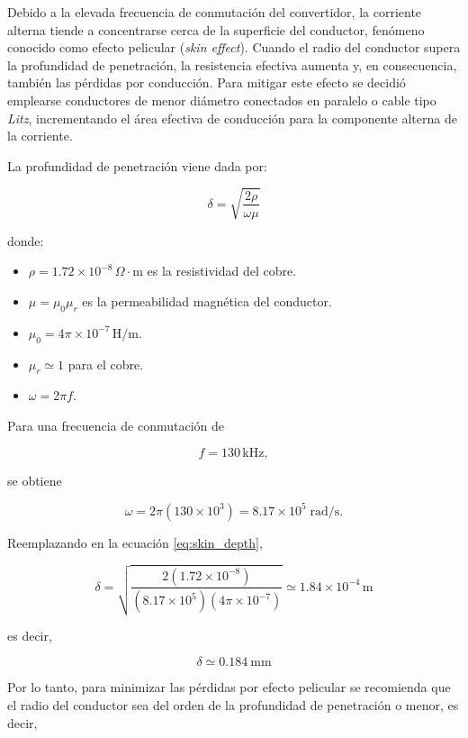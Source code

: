 \documentclass[]{article}
\begin{document}
	Debido a la elevada frecuencia de conmutación del convertidor, la corriente alterna tiende a concentrarse cerca de la superficie del conductor, fenómeno conocido como efecto pelicular (\textit{skin effect}). Cuando el radio del conductor supera la profundidad de penetración, la resistencia efectiva aumenta y, en consecuencia, también las pérdidas por conducción. Para mitigar este efecto se decidió emplearse conductores de menor diámetro conectados en paralelo o cable tipo \textit{Litz}, incrementando el área efectiva de conducción para la componente alterna de la corriente.
	
	La profundidad de penetración viene dada por:
	
	\begin{equation}
		\delta=\sqrt{\frac{2\rho}{\omega\mu}}
		\label{eq:skin_depth}
	\end{equation}
	
	donde:
	
	\begin{itemize}
		\item $\rho = 1.72\times10^{-8}\,\Omega\cdot\mathrm{m}$ es la resistividad del cobre.
		\item $\mu=\mu_0\mu_r$ es la permeabilidad magnética del conductor.
		\item $\mu_0=4\pi\times10^{-7}\,\mathrm{H/m}$.
		\item $\mu_r\simeq1$ para el cobre.
		\item $\omega=2\pi f$.
	\end{itemize}
	
	Para una frecuencia de conmutación de
	
	\[
	f=130\,\mathrm{kHz},
	\]
	
	se obtiene
	
	\[
	\omega=2\pi(130\times10^3)
	=8.17\times10^5\;\mathrm{rad/s}.
	\]
	
	Reemplazando en la ecuación \eqref{eq:skin_depth},
	
	\begin{equation}
		\delta=
		\sqrt{
			\frac{
				2(1.72\times10^{-8})
			}{
				(8.17\times10^5)
				(4\pi\times10^{-7})
			}
		}
		\simeq1.84\times10^{-4}\,\mathrm{m}
	\end{equation}
	
	es decir,
	
	\begin{equation}
		\boxed{\delta\simeq0.184\ \mathrm{mm}}
	\end{equation}
	
	Por lo tanto, para minimizar las pérdidas por efecto pelicular se recomienda que el radio del conductor sea del orden de la profundidad de penetración o menor, es decir,
	
\end{document}
